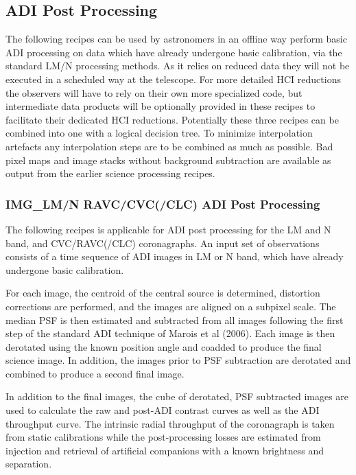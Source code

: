 
\subsection{ADI Post Processing}
\label{ssec:ADI_postprocessing}



The following recipes can be used by astronomers in an offline way
perform basic ADI processing on data which have already undergone
basic calibration, via the standard LM/N processing methods.  As it
relies on reduced data they will not be executed in a scheduled way at
the telescope. For more detailed HCI reductions the observers will
have to rely on their own more specialized code, but intermediate data
products will be optionally provided in these recipes to facilitate
their dedicated HCI reductions. Potentially these three recipes can be combined into one with a logical decision tree. To minimize interpolation artefacts any interpolation steps are to be combined as much as possible. Bad pixel maps and image stacks without background subtraction are available as output from the earlier science processing recipes.

\subsubsection{IMG\_LM/N RAVC/CVC(/CLC) ADI Post Processing}
\label{sssec:adi_img_vc}


The following recipes is applicable for ADI post processing for the LM
and N band, and CVC/RAVC(/CLC) coronagraphs. An input set of
observations consists of a time sequence of ADI images in LM or N
band, which have already undergone basic calibration. 

For each image, the centroid of the central source is determined,
distortion corrections are performed, and the images are aligned on a
subpixel scale. The median PSF is then estimated and subtracted from
all images following the first step of the standard ADI technique of
Marois et al (2006).  Each image is then derotated using the known
position angle and coadded to produce the final science image. In
addition, the images prior to PSF subtraction are derotated and
combined to produce a second final image.

In addition to the final images, the cube of derotated, PSF subtracted
images are used to calculate the raw and post-ADI contrast curves as
well as the ADI throughput curve. The intrinsic radial throughput of
the coronagraph is taken from static calibrations while the
post-processing losses are estimated from injection and retrieval of
artificial companions with a known brightness and separation.

